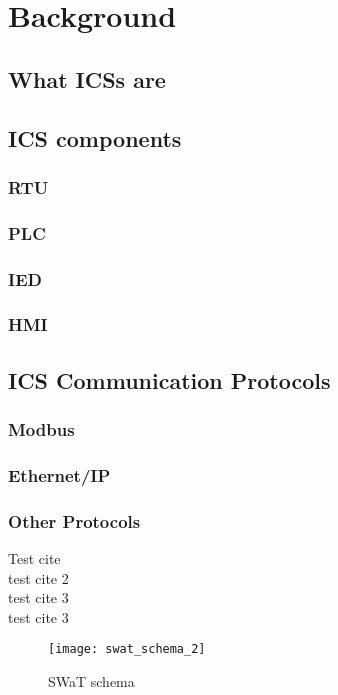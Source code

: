 \chapter{Background}
\label{background}

\section{What ICSs are}

\section{ICS components}
\label{sec:ics_components}
\subsection{RTU}
\subsection{PLC}
\subsection{IED}
\subsection{HMI}

\section{ICS Communication Protocols}
\label{sec:ics_protocols}
\subsection{Modbus}
\subsection{Ethernet/IP}
\subsection{Other Protocols}

Test cite \cite{ceccato} \\
test cite 2 \cite{itrust_swat} \\
test cite 3 \cite{itrust_site} \\
test cite 3 \cite{itrust_invariants_paper}\\

\begin{figure}[h]
	\texttt{[image: swat\_schema\_2]}
	\caption{SWaT schema}
	\label{fig:Schema SWaT}
\end{figure}

